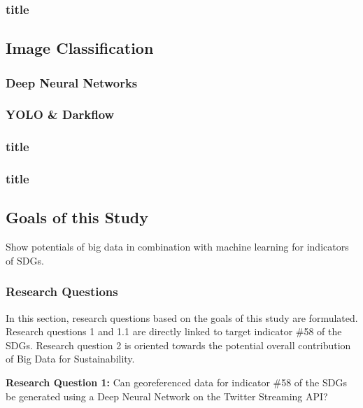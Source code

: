 			\subsubsection{title}
			
			
			
		\subsection{Image Classification}
			\subsubsection{Deep Neural Networks}
			
			\subsubsection{YOLO \& Darkflow}
			
			\subsubsection{title}
			
			\subsubsection{title}
			
			
			
		\subsection{Goals of this Study}
		
		Show potentials of big data in combination with machine learning for indicators of SDGs.
		
		
		
			\subsubsection{Research Questions}
			
			In this section, research questions based on the goals of this study are formulated. Research questions 1 and 1.1 are directly linked to target indicator \#58 of the SDGs. Research question 2 is oriented towards the potential overall contribution of Big Data for Sustainability.
			
			\bigskip
			
			\begin{tcolorbox}
				\textbf{Research Question 1:} \smallskip Can georeferenced data for indicator \#58 of the SDGs be generated using a Deep Neural Network on the Twitter Streaming API?
			\end{tcolorbox}
			
